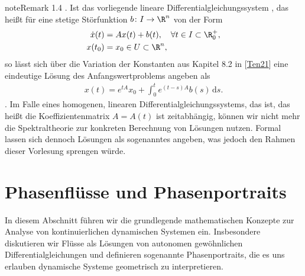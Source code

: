 \documentclass[letterpaper,10pt,english]{jupyterBook}
\begin{document}
\begin{sphinxadmonition}{note}{Remark 1.4}
. Ist das vorliegende lineare Differentialgleichungssystem , das heißt für eine stetige Störfunktion \(b \colon I \rightarrow \R^n\) von der Form
\begin{equation}\label{equation:ode/repetition:eq:lin_inhom_dglsystem}
\begin{split}\dot{x}(t) &= A x(t) + b(t), \quad \forall t \in I \subset \R^+_0, \\
x(t_0) &= x_0 \in U \subset \R^n,\end{split}
\end{equation}
\sphinxAtStartPar
so lässt sich über die Variation der Konstanten aus Kapitel 8.2 in {[}\hyperlink{cite.references:id12}{Ten21}{]} eine eindeutige Lösung des Anfangswertproblems {\hyperref[\detokenize{ode/repetition:equation-eq-lin-inhom-dglsystem}]{}} angeben als
\begin{equation*}
\begin{split}x(t) = e^{tA}x_0 + \int_0^t e^{(t-s)A}b(s) \, \mathrm{d}s.\end{split}
\end{equation*}
. Im Falle eines homogenen, linearen Differentialgleichungssystems, das  ist, das heißt die Koeffizientenmatrix \(A = A(t)\) ist zeitabhängig, können wir nicht mehr die Spektraltheorie zur konkreten Berechnung von Lösungen nutzen.
Formal lassen sich dennoch Lösungen als sogenanntes  angeben, was jedoch den Rahmen dieser Vorlesung sprengen würde.
\end{sphinxadmonition}


\section{Phasenflüsse und Phasenportraits}
\label{\detokenize{ode/fluesse:phasenflusse-und-phasenportraits}}\label{\detokenize{ode/fluesse:s-fluesse}}\label{\detokenize{ode/fluesse::doc}}
\sphinxAtStartPar
In diesem Abschnitt führen wir die grundlegende mathematischen Konzepte zur Analyse von kontinuierlichen dynamischen Systemen ein. Insbesondere diskutieren wir Flüsse als Lösungen von autonomen gewöhnlichen Differentialgleichungen und definieren sogenannte Phasenportraits, die es uns erlauben dynamische Systeme geometrisch zu interpretieren.
\end{document}
